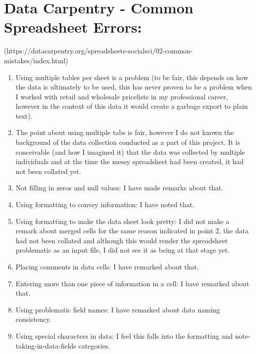 \documentclass{article}
\begin{document}
\section{Data Carpentry - Common Spreadsheet Errors:}
(https://datacarpentry.org/spreadsheets-socialsci/02-common-mistakes/index.html)
\begin{enumerate}
    \item Using multiple tables per sheet is a problem (to be fair, this depends on how the data is ultimately to be used, this has never proven to be a problem when I worked with retail and wholesale pricelists in my professional career, however in the context of this data it would create a garbage export to plain text).
    \item The point about using multiple tabs is fair, however I do not known the background of the data collection conducted as a part of this project. It is conceivable (and how I imagined it) that the data was collected by multiple individuals and at the time the messy spreadsheet had been created, it had not been collated yet.
    \item Not filling in zeros and null values: I have made remarks about that.
    \item Using formatting to convey information: I have noted that.
    \item Using formatting to make the data sheet look pretty: I did not make a remark about merged cells for the same reason indicated in point 2, the data had not been collated and although this would render the spreadsheet problematic as an input file, I did not see it as being at that stage yet.
    \item Placing comments in data cells: I have remarked about that.
    \item Entering more than one piece of information in a cell: I have remarked about that.
    \item Using problematic field names: I have remarked about data naming consistency.
    \item Using special characters in data: I feel this falls into the formatting and note-taking-in-data-fields categories.

\end{enumerate}
\end{document}
